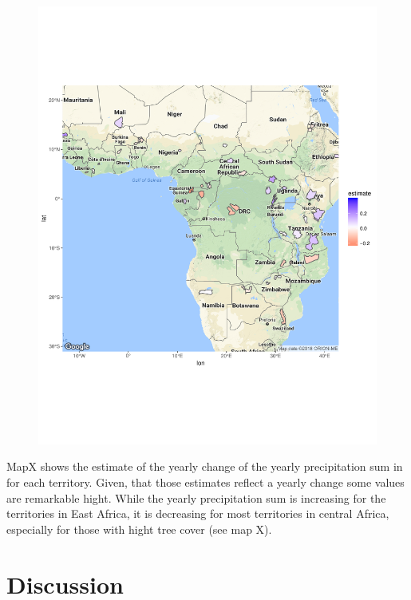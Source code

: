 \documentclass[11pt,twoside,a4paper,final]{report}
\begin{document}
\begin{center}

   \begin{figure}[h]
     \begin{center}
       \includegraphics[width=15cm]{images/sample_session_3_change_map.pdf}
    \end{center}
  \end{figure}
\end{center}



MapX shows the estimate of the yearly change of the yearly precipitation sum in for each territory. Given, that those estimates reflect a yearly change some values are remarkable hight. While the yearly precipitation sum is increasing for the territories in East Africa, it is decreasing for most territories in central Africa, especially for those with hight tree cover (see map X).


\chapter{Discussion}
\end{document}
